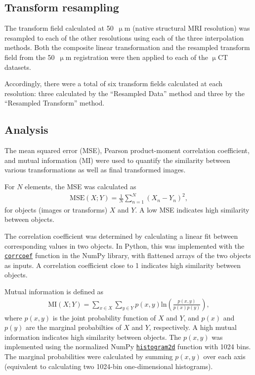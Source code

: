\documentclass[11pt]{article}
\begin{document}
\subsection{Transform resampling}
The transform field calculated at 50~$\upmu$m (native structural MRI resolution) was
resampled to each of the other resolutions using each of the three interpolation
methods. Both the composite linear transformation and the resampled transform field
from the 50~$\upmu$m registration were then applied to each of the $\upmu$CT
datasets.

Accordingly, there were a total of six transform fields calculated at each
resolution: three calculated by the ``Resampled Data'' method and three
by the ``Resampled Transform'' method.

\subsection{Analysis}
The mean squared error (MSE), Pearson product-moment correlation coefficient,
and mutual information (MI) were used to quantify the similarity between various
transformations as well as final transformed images.

For $N$ elements, the MSE was calculated as
\begin{align}
  \text{MSE}(X; Y) = \frac{1}{N}\sum_{n=1}^{N} \left(X_n - Y_n\right)^2,
\end{align}
for objects (images or transforms) $X$ and $Y$. A low MSE indicates high
similarity between objects.

The correlation coefficient was determined by calculating a linear fit between
corresponding values in two objects. In Python, this was implemented with the
\href{https://docs.scipy.org/doc/numpy-1.14.0/reference/generated/numpy.corrcoef.html}{\texttt{corrcoef}}
function in the NumPy library, with flattened arrays of the two objects as
inputs. A correlation coefficient close to 1 indicates high similarity between
objects.

Mutual information is defined as
\begin{align}
  \text{MI}(X; Y) = \sum_{x \in X} \sum_{y \in Y} p(x, y) \text{ln}\left(\frac{p(x,y)}{p(x) p(y)}\right),
\end{align}
where $p(x,y)$ is the joint probability function of $X$ and $Y$, and $p(x)$ and
$p(y)$ are the marginal probabilties of $X$ and $Y$, respectively. A high mutual
information indicates high similarity between objects. The $p(x,y)$ was
implemented using the normalized NumPy
\href{https://docs.scipy.org/doc/numpy-1.14.0/reference/generated/numpy.histogram2d.html}{\texttt{histogram2d}} function with 1024 bins. The marginal probabilities were calculated by summing $p(x,y)$ over each axis (equivalent to calculating two 1024-bin one-dimensional histograms).
\end{document}
